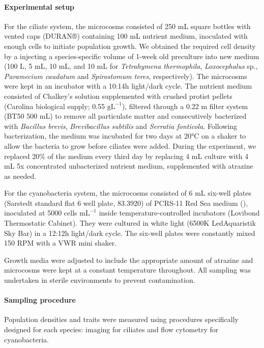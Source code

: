 \documentclass[
  letterpaper,
  DIV=11,
  numbers=noendperiod]{scrartcl}
\let\oldparagraph\paragraph
\renewcommand{\paragraph}[1]{\oldparagraph{#1}\mbox{}}
\begin{document}
\paragraph{Experimental setup}\label{experimental-setup}

For the ciliate system, the microcosms consisted of 250 mL square
bottles with vented caps (DURAN®) containing 100 mL nutrient medium,
inoculated with enough cells to initiate population growth. We obtained
the required cell density by a injecting a species-specific volume of
1-week old preculture into new medium (100 \textmu L, 5 mL, 10 mL, and
10 mL for \emph{Tetrahymena thermophila}, \emph{Loxocephalus} sp.,
\emph{Paramecium caudatum} and \emph{Spirostomum teres}, respectively).
The microcosms were kept in an incubator with a 10:14h light/dark cycle.
The nutrient medium consisted of Chalkey's solution supplemented with
crushed protist pellets (Carolina biological supply; 0.55
\(\mathrm{gL}^{-1}\)), filtered through a 0.22 \textmu m filter system
(BT50 500 mL) to remove all particulate matter and consecutively
bacterized with \emph{Bacillus brevis}, \emph{Brevibacillus subtilis}
and \emph{Serratia fonticola}. Following bacterization, the medium was
incubated for two days at 20°C on a shaker to allow the bacteria to grow
before ciliates were added. During the experiment, we replaced 20\% of
the medium every third day by replacing 4 mL culture with 4 mL 5x
concentrated unbacterized nutrient medium, supplemented with atrazine as
needed.

For the cyanobacteria system, the microcosms consisted of 6 mL six-well
plates (Sarstedt standard flat 6 well plate, 83.3920) of PCRS-11 Red Sea
medium (), inoculated at
5000 cells \(\mathrm{mL}^{-1}\) inside temperature-controlled incubators
(Lovibond Thermostatic Cabinet). They were cultured in white light
(6500K LedAquaristik Sky Bar) in a 12:12h light/dark cycle. The six-well
plates were constantly mixed 150 RPM with a VWR mini shaker.

Growth media were adjusted to include the appropriate amount of atrazine
and microcosms were kept at a constant temperature throughout. All
sampling was undertaken in sterile environments to prevent
contamination.

\paragraph{Sampling procedure}\label{sampling-procedure}

Population densities and traits were measured using procedures
specifically designed for each species: imaging for ciliates and flow
cytometry for cyanobacteria.
\end{document}
